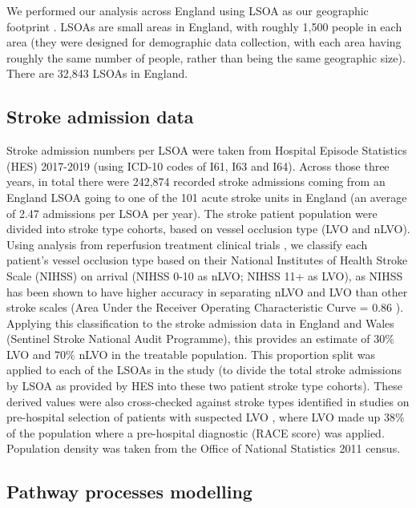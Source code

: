 We performed our analysis across England using LSOA as our geographic footprint \cite{ons}. LSOAs are small areas in England, with roughly 1,500 people in each area (they were designed for demographic data collection, with each area having roughly the same number of people, rather than being the same geographic size). There are 32,843 LSOAs in England.

\subsection{Stroke admission data}

Stroke admission numbers per LSOA were taken from Hospital Episode Statistics (HES) 2017-2019 (using ICD-10 codes of I61, I63 and I64). Across those three years, in total there were 242,874 recorded stroke admissions coming from an England LSOA going to one of the 101 acute stroke units in England (an average of 2.47 admissions per LSOA per year). The stroke patient population were divided into stroke type cohorts, based on vessel occlusion type (LVO and nLVO). Using analysis from reperfusion treatment clinical trials \cite{lees_time_2010, emberson_effect_2014, goyal_endovascular_2016, fransen_time_2016}, we classify each patient's vessel occlusion type based on their National Institutes of Health Stroke Scale (NIHSS) on arrival (NIHSS 0-10 as nLVO; NIHSS 11+ as LVO), as NIHSS has been shown to have higher accuracy in separating nLVO and LVO than other stroke scales (Area Under the Receiver Operating Characteristic Curve = 0.86 \cite{duvekot_comparison_2021}). Applying this classification to the stroke admission data in England and Wales (Sentinel Stroke National Audit Programme), this provides an estimate of 30\% LVO and 70\% nLVO in the treatable population. This proportion split was applied to each of the LSOAs in the study (to divide the total stroke admissions by LSOA as provided by HES into these two patient stroke type cohorts). These derived values were also cross-checked against stroke types identified in studies on pre-hospital selection of patients with suspected LVO \cite{de_la_ossa_herrero_design_2013}, where LVO made up 38\% of the population where a pre-hospital diagnostic (RACE score) was applied. Population density was taken from the Office of National Statistics 2011 census.

\subsection{Pathway processes modelling}

